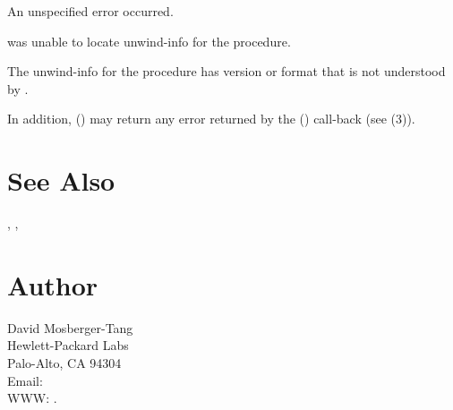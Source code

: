 \documentclass{article}
\begin{document}
\begin{Description}
\item[\Const{UNW\_EUNSPEC}] An unspecified error occurred.
\item[\Const{UNW\_ENOINFO}]  was unable to locate
  unwind-info for the procedure.
\item[\Const{UNW\_EBADVERSION}] The unwind-info for the procedure has
  version or format that is not understood by .
\end{Description}
In addition, () may return any error
returned by the () call-back (see
(3)).

\section{See Also}

,
,

\section{Author}

\noindent
David Mosberger-Tang\\
Hewlett-Packard Labs\\
Palo-Alto, CA 94304\\
Email: \\
WWW: .
\LatexManEnd
\end{document}
